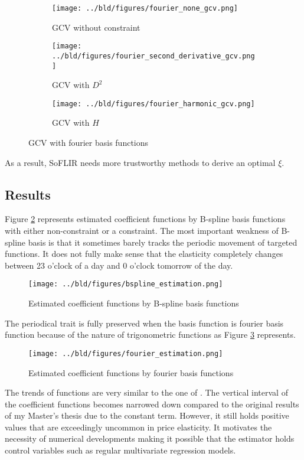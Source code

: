 \documentclass[11pt, a4paper, leqno]{article}
\begin{document}
\begin{figure}[H]
	\centering
	\begin{subfigure}{.33\textwidth}
		\centering
		\texttt{[image: ../bld/figures/fourier\_none\_gcv.png]}
		\caption{GCV without constraint}
	\end{subfigure}%
	\begin{subfigure}{.33\textwidth}
		\centering
		\texttt{[image: ../bld/figures/fourier\_second\_derivative\_gcv.png]}
		\caption{GCV with $D^2$}
	\end{subfigure}
	\begin{subfigure}{.33\textwidth}
		\centering
		\texttt{[image: ../bld/figures/fourier\_harmonic\_gcv.png]}
		\caption{GCV with $H$}
	\end{subfigure}
	\caption{GCV with fourier basis functions}
	\label{GCV}
\end{figure}

As a result, SoFLIR needs more trustworthy methods to derive an optimal $\xi$.

\subsection{Results}
Figure \ref{bspline_estimation} represents estimated coefficient functions by B-spline basis functions with either non-constraint or a constraint. The most important weakness of B-spline basis is that it sometimes barely tracks the periodic movement of targeted functions. It does not fully make sense that the elasticity completely changes between 23 o'clock of a day and 0 o'clock tomorrow of the day.

\begin{figure}[H]
	\centering
	\texttt{[image: ../bld/figures/bspline\_estimation.png]}

	\caption{Estimated coefficient functions by B-spline basis functions}
	\label{bspline_estimation}

\end{figure}

The periodical trait is fully preserved when the basis function is fourier basis function because of the nature of trigonometric functions as Figure \ref{fourier_estimation} represents.
\begin{figure}[H]

	\centering
	\texttt{[image: ../bld/figures/fourier\_estimation.png]}

	\caption{Estimated coefficient functions by fourier basis functions}
	\label{fourier_estimation}

\end{figure}
The trends of functions are very similar to the one of \citet{Knaut.2016}. The vertical interval of the coefficient functions becomes narrowed down compared to the original results of my Master's thesis due to the constant term. However, it still holds positive values that are exceedingly uncommon in price elasticity. It motivates the necessity of numerical developments making it possible that the estimator holds control variables such as regular multivariate regression models.
\end{document}
